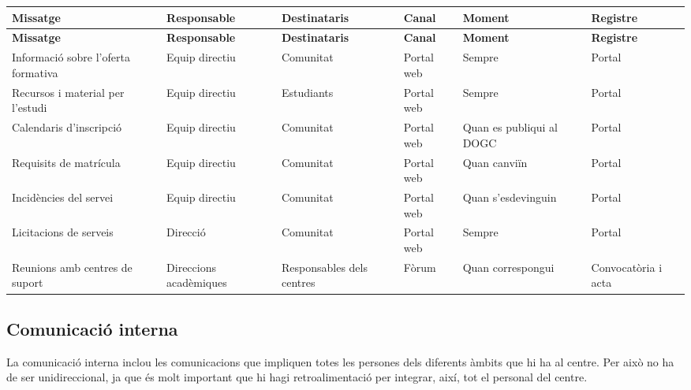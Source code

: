 \documentclass[fontsize=10pt,%
paper=a4,%
DIV=14,%
twoside=semi,%
pagesize=auto,%
parskip=half,
captions=tableheading,%
numbers=noenddot,%
toc=graduated%
]{scrartcl}
\renewcommand{\arraystretch}{1.75}%
\renewcommand{\arraystretch}{1.75}%
\begin{document}
\small{
\setlength{\tabcolsep}{10pt}
\renewcommand{\arraystretch}{1.5}
\begin{longtable}{p{3cm}p{2cm}p{2cm}p{1.5cm}p{2cm}p{1.5cm}}
\hline
\textbf{Missatge}                   & \textbf{Responsable}   & \textbf{Destinataris}     & \textbf{Canal} & \textbf{Moment}          & \textbf{Registre}   \\
\hline \endfirsthead
\hline
\textbf{Missatge}                   & \textbf{Responsable}   & \textbf{Destinataris}     & \textbf{Canal} & \textbf{Moment}          & \textbf{Registre}   \\
\hline \endhead
Informació sobre l'oferta formativa & Equip directiu         & Comunitat                 & Portal web     & Sempre                   & Portal              \\
Recursos i material per l'estudi    & Equip directiu         & Estudiants                & Portal web     & Sempre                   & Portal              \\
Calendaris d'inscripció             & Equip directiu         & Comunitat                 & Portal web     & Quan es publiqui al DOGC & Portal              \\
Requisits de matrícula              & Equip directiu         & Comunitat                 & Portal web     & Quan canviïn             & Portal              \\
Incidències del servei              & Equip directiu         & Comunitat                 & Portal web     & Quan s'esdevinguin       & Portal              \\
Licitacions de serveis              & Direcció               & Comunitat                 & Portal web     & Sempre                   & Portal              \\
Reunions amb centres de suport      & Direccions acadèmiques & Responsables dels centres & Fòrum          & Quan correspongui        & Convocatòria i acta \\
\end{longtable}
}%



\subsection{Comunicació interna}

La comunicació interna inclou les comunicacions que impliquen totes les persones dels
diferents àmbits que hi ha al centre. Per això no ha de ser unidireccional, ja que és
molt important que hi hagi retroalimentació per integrar, així, tot el personal del centre. 
\end{document}
